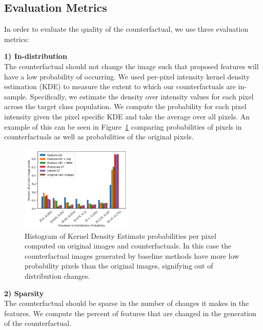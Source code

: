 \documentclass[letterpaper]{article} %
\begin{document}


\subsection{Evaluation Metrics}
In order to evaluate the quality of the counterfactual,  we use three evaluation metrics:


\textbf{1) In-distribution} \\
\noindent The counterfactual should not change the image such that proposed features will have a low probability of occurring. We used per-pixel intensity kernel density estimation (KDE) to measure the extent to which our counterfactuals are in-sample. Specifically, we estimate the density over intensity values for each pixel across the target class population. We compute the probability for each pixel intensity given the pixel specific KDE and take the average over all pixels. An example of this can be seen in Figure~\ref{fig:kde} comparing probabilities of pixels in counterfactuals as well as probabilities of the original pixels. 

\begin{figure}[hbt!]
  \includegraphics[width=0.48\textwidth]{figures/mnist/hist.png}
  \caption{Histogram of Kernel Density Estimate probabilities per pixel computed on original images and counterfactuals. In this case the counterfactual images generated by baseline methods have more low probability pixels than the original images, signifying out of distribution changes.}
  \label{fig:kde}
\end{figure}



\textbf{2) Sparsity} \\
\noindent The counterfactual should be sparse in the number of changes it makes in the features. We compute the percent of features that are changed in the generation of the counterfactual.
\end{document}
